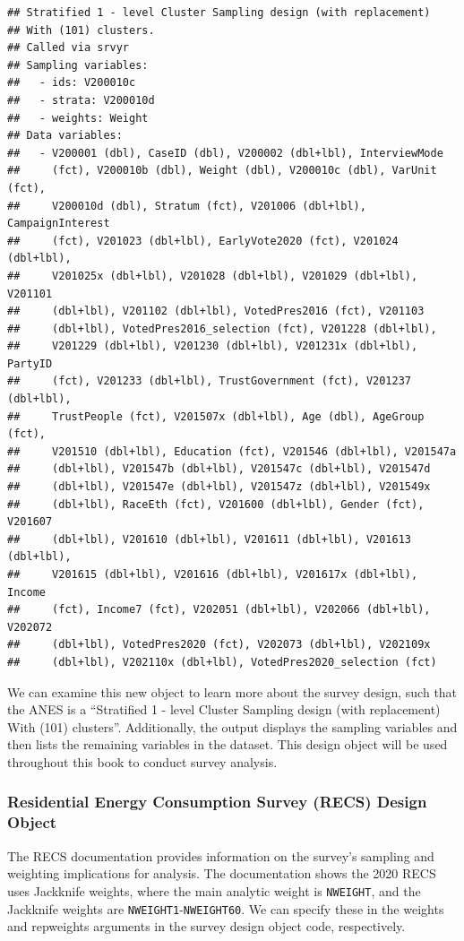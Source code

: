 \documentclass[
]{krantz}
\begin{document}
\begin{verbatim}
## Stratified 1 - level Cluster Sampling design (with replacement)
## With (101) clusters.
## Called via srvyr
## Sampling variables:
##   - ids: V200010c 
##   - strata: V200010d 
##   - weights: Weight 
## Data variables: 
##   - V200001 (dbl), CaseID (dbl), V200002 (dbl+lbl), InterviewMode
##     (fct), V200010b (dbl), Weight (dbl), V200010c (dbl), VarUnit (fct),
##     V200010d (dbl), Stratum (fct), V201006 (dbl+lbl), CampaignInterest
##     (fct), V201023 (dbl+lbl), EarlyVote2020 (fct), V201024 (dbl+lbl),
##     V201025x (dbl+lbl), V201028 (dbl+lbl), V201029 (dbl+lbl), V201101
##     (dbl+lbl), V201102 (dbl+lbl), VotedPres2016 (fct), V201103
##     (dbl+lbl), VotedPres2016_selection (fct), V201228 (dbl+lbl),
##     V201229 (dbl+lbl), V201230 (dbl+lbl), V201231x (dbl+lbl), PartyID
##     (fct), V201233 (dbl+lbl), TrustGovernment (fct), V201237 (dbl+lbl),
##     TrustPeople (fct), V201507x (dbl+lbl), Age (dbl), AgeGroup (fct),
##     V201510 (dbl+lbl), Education (fct), V201546 (dbl+lbl), V201547a
##     (dbl+lbl), V201547b (dbl+lbl), V201547c (dbl+lbl), V201547d
##     (dbl+lbl), V201547e (dbl+lbl), V201547z (dbl+lbl), V201549x
##     (dbl+lbl), RaceEth (fct), V201600 (dbl+lbl), Gender (fct), V201607
##     (dbl+lbl), V201610 (dbl+lbl), V201611 (dbl+lbl), V201613 (dbl+lbl),
##     V201615 (dbl+lbl), V201616 (dbl+lbl), V201617x (dbl+lbl), Income
##     (fct), Income7 (fct), V202051 (dbl+lbl), V202066 (dbl+lbl), V202072
##     (dbl+lbl), VotedPres2020 (fct), V202073 (dbl+lbl), V202109x
##     (dbl+lbl), V202110x (dbl+lbl), VotedPres2020_selection (fct)
\end{verbatim}

We can examine this new object to learn more about the survey design, such that the ANES is a ``Stratified 1 - level Cluster Sampling design (with replacement) With (101) clusters''. Additionally, the output displays the sampling variables and then lists the remaining variables in the dataset. This design object will be used throughout this book to conduct survey analysis.

\hypertarget{residential-energy-consumption-survey-recs-design-object}{%
\subsubsection*{Residential Energy Consumption Survey (RECS) Design Object}\label{residential-energy-consumption-survey-recs-design-object}}


The RECS documentation \citep{recs-2020-tech} provides information on the survey's sampling and weighting implications for analysis. The documentation shows the 2020 RECS uses Jackknife weights, where the main analytic weight is \texttt{NWEIGHT}, and the Jackknife weights are \texttt{NWEIGHT1}-\texttt{NWEIGHT60}. We can specify these in the weights and repweights arguments in the survey design object code, respectively.
\end{document}
